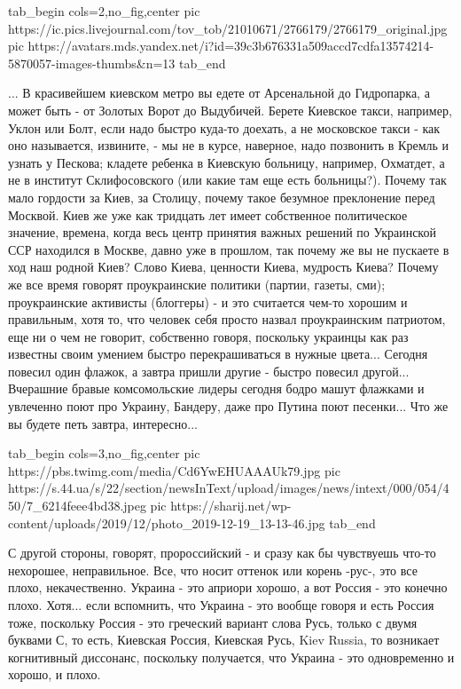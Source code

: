 \ifcmt
  tab_begin cols=2,no_fig,center
		 pic https://ic.pics.livejournal.com/tov_tob/21010671/2766179/2766179_original.jpg
		 pic https://avatars.mds.yandex.net/i?id=39c3b676331a509accd7cdfa13574214-5870057-images-thumbs&n=13
  tab_end
\fi

... В красивейшем киевском метро вы
едете от Арсенальной до Гидропарка, а может быть - от Золотых Ворот до
Выдубичей. Берете Киевское такси, например, Уклон или Болт, если надо быстро
куда-то доехать, а не московское такси - как оно называется, извините, - мы не
в курсе, наверное, надо позвонить в Кремль и узнать у Пескова; кладете ребенка
в Киевскую больницу, например, Охматдет, а не в институт Склифосовского (или
какие там еще есть больницы?). Почему так мало гордости за Киев, за Столицу,
почему такое безумное преклонение перед Москвой.  Киев же уже как тридцать лет
имеет собственное политическое значение, времена, когда весь центр принятия
важных решений по Украинской ССР находился в Москве, давно уже в прошлом, так
почему же вы не пускаете в ход наш родной Киев? Слово Киева, ценности Киева,
мудрость Киева? Почему же все время говорят проукраинские политики (партии,
газеты, сми); проукраинские активисты (блоггеры) - и это считается чем-то
хорошим и правильным, хотя то, что человек себя просто назвал проукраинским
патриотом, еще ни о чем не говорит, собственно говоря, поскольку украинцы как
раз известны своим умением быстро перекрашиваться в нужные цвета... Сегодня
повесил один флажок, а завтра пришли другие - быстро повесил другой...
Вчерашние бравые комсомольские лидеры сегодня бодро машут флажками и увлеченно
поют про Украину, Бандеру, даже про Путина поют песенки... Что же вы будете петь завтра, интересно... 

\ifcmt
  tab_begin cols=3,no_fig,center
     pic https://pbs.twimg.com/media/Cd6YwEHUAAAUk79.jpg
		 pic https://s.44.ua/s/22/section/newsInText/upload/images/news/intext/000/054/450/7_6214feee4bd38.jpeg
		 pic https://sharij.net/wp-content/uploads/2019/12/photo_2019-12-19_13-13-46.jpg
  tab_end
\fi

С другой
стороны, говорят, пророссийский - и сразу как бы чувствуешь что-то нехорошее,
неправильное. Все, что носит оттенок или корень -рус-, это все плохо,
некачественно.  Украина - это априори хорошо, а вот Россия - это конечно плохо.
Хотя... если вспомнить, что Украина - это вообще говоря и есть Россия тоже,
поскольку Россия - это греческий вариант слова Русь, только с двумя буквами С,
то есть, Киевская Россия, Киевская Русь, Kiev Russia, то возникает когнитивный
диссонанс, поскольку получается, что Украина - это одновременно и хорошо, и
плохо. 

